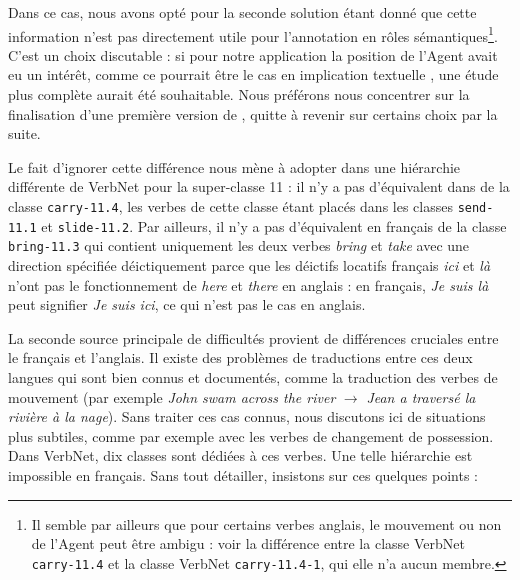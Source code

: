 Dans ce cas, nous avons opté pour la seconde solution étant donné que cette
information n'est pas directement utile pour l'annotation en rôles
sémantiques\footnote{Il semble par ailleurs que pour certains verbes anglais,
    le mouvement ou non de l'Agent peut être ambigu : voir la différence entre
la classe VerbNet {\color{blue}\texttt{carry-11.4}} et la classe VerbNet
{\color{blue}\texttt{carry-11.4-1}}, qui elle n'a aucun membre.}.  C'est un
choix discutable : si pour notre application la position de l'Agent avait eu un
intérêt, comme ce pourrait être le cas en implication textuelle
\citep{bobrow2007parc}, une étude plus complète aurait été souhaitable. Nous
préférons nous concentrer sur la finalisation d'une première version de
\verbenet{}, quitte à revenir sur certains choix par la suite.

Le fait d'ignorer cette différence nous mène à adopter dans \verbenet{} une
hiérarchie différente de VerbNet pour la super-classe 11 : il n'y a pas
d'équivalent dans \verbenet{} de la classe {\color{blue}\texttt{carry-11.4}},
les verbes de cette classe étant placés dans les classes
{\color{blue}\texttt{send-11.1}} et {\color{blue}\texttt{slide-11.2}}. Par
ailleurs, il n'y a pas d'équivalent en français de la classe
{\color{blue}\texttt{bring-11.3}} qui contient uniquement les deux verbes
\textit{bring} et \textit{take} avec une direction spécifiée déictiquement
\citep[page 135]{levin1993english} parce que les déictifs locatifs français
\textit{ici} et \textit{là} n'ont pas le fonctionnement de \textit{here} et
\textit{there} en anglais : en français, \textit{Je suis là} peut
signifier \textit{Je suis ici}, ce qui n'est pas le cas en anglais.

La seconde source principale de difficultés provient de différences cruciales
entre le français et l'anglais. Il existe des problèmes de traductions entre
ces deux langues qui sont bien connus et documentés, comme la traduction des
verbes de mouvement (par exemple \textit{John swam across the river}
$\rightarrow$ \textit{Jean a traversé la rivière à la nage}). Sans traiter ces
cas connus, nous discutons ici de situations plus subtiles, comme par exemple
avec les verbes de changement de possession. Dans VerbNet, dix classes sont
dédiées à ces verbes. Une telle hiérarchie est impossible en français. Sans
tout détailler, insistons sur ces quelques points :

